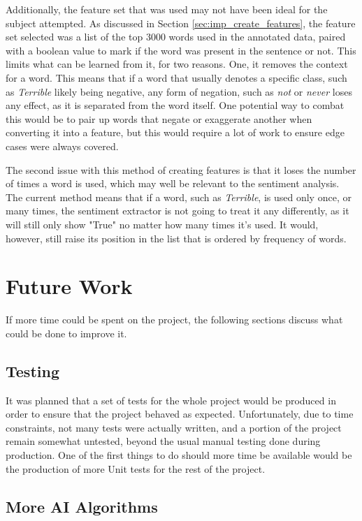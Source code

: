 Additionally, the feature set that was used may not have been ideal for the subject attempted. As discussed in Section \ref{sec:imp_create_features}, the feature set selected was a list of the top 3000 words used in the annotated data, paired with a boolean value to mark if the word was present in the sentence or not. This limits what can be learned from it, for two reasons. One, it removes the context for a word. This means that if a word that usually denotes a specific class, such as \emph{Terrible} likely being negative, any form of negation, such as \emph{not} or \emph{never} loses any effect, as it is separated from the word itself. One potential way to combat this would be to pair up words that negate or exaggerate another when converting it into a feature, but this would require a lot of work to ensure edge cases were always covered.

The second issue with this method of creating features is that it loses the number of times a word is used, which may well be relevant to the sentiment analysis. The current method means that if a word, such as \emph{Terrible}, is used only once, or many times, the sentiment extractor is not going to treat it any differently, as it will still only show "True" no matter how many times it's used. It would, however, still raise its position in the list that is ordered by frequency of words. 

\section{Future Work}

If more time could be spent on the project, the following sections discuss what could be done to improve it.

\subsection{Testing}

It was planned that a set of tests for the whole project would be produced in order to ensure that the project behaved as expected. Unfortunately, due to time constraints, not many tests were actually written, and a portion of the project remain somewhat untested, beyond the usual manual testing done during production. One of the first things to do should more time be available would be the production of more Unit tests for the rest of the project.

\subsection{More AI Algorithms}


